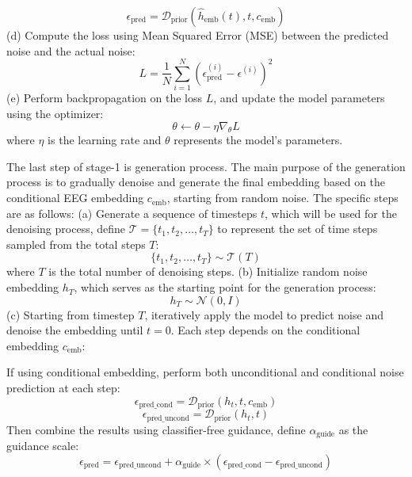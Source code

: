 \documentclass{article}
\begin{document}
\begin{equation}
\epsilon_{\text{pred}} = \mathcal{D}_{\text{prior}}(\hat{h}_{\text{emb}}(t), t, c_{\text{emb}})
\end{equation}
(d) Compute the loss using Mean Squared Error (MSE) between the predicted noise and the actual noise:
\begin{equation}
L = \frac{1}{N} \sum_{i=1}^{N} \left( \epsilon_{\text{pred}}^{(i)} - \epsilon^{(i)} \right)^2
\end{equation}
(e) Perform backpropagation on the loss $L$, and update the model parameters using the optimizer:
\begin{equation}
\theta \leftarrow \theta - \eta \nabla_{\theta} L
\end{equation}
where $\eta$ is the learning rate and $\theta$ represents the model's parameters.

The last step of stage-1 is generation process. The main purpose of the generation process is to gradually denoise and generate the final embedding based on the conditional EEG embedding $c_{\text{emb}}$, starting from random noise. The specific steps are as follows: (a) Generate a sequence of timesteps $t$, which will be used for the denoising process, define $\mathcal{T} = \{t_1, t_2, \dots, t_T\}$ to represent the set of time steps sampled from the total steps $T$:
\begin{equation}
\{t_1, t_2, \dots, t_T\} \sim \mathcal{T}(T)
\end{equation}
where $T$ is the total number of denoising steps.
(b) Initialize random noise embedding $h_T$, which serves as the starting point for the generation process:
\begin{equation}
h_T \sim \mathcal{N}(0, I)
\end{equation}
(c) Starting from timestep $T$, iteratively apply the model to predict noise and denoise the embedding until $t = 0$. Each step depends on the conditional embedding $c_{\text{emb}}$:

If using conditional embedding, perform both unconditional and conditional noise prediction at each step:
\begin{equation}
\epsilon_{\text{pred\_cond}} = \mathcal{D}_{\text{prior}}(h_t, t, c_{\text{emb}})
\end{equation}
\begin{equation}
\epsilon_{\text{pred\_uncond}} = \mathcal{D}_{\text{prior}}(h_t, t)
\end{equation}
Then combine the results using classifier-free guidance, define $\alpha_{\text{guide}}$ as the guidance scale:
\begin{equation}
\epsilon_{\text{pred}} = \epsilon_{\text{pred\_uncond}} + \alpha_{\text{guide}} \times (\epsilon_{\text{pred\_cond}} - \epsilon_{\text{pred\_uncond}})
\end{equation}
\end{document}
